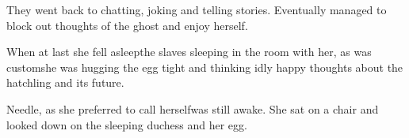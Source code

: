 They went back to chatting, joking and telling stories. 
Eventually \Tiroco{} managed to block out thoughts of the ghost and enjoy herself. 

When at last she fell asleep\dash the slaves sleeping in the room with her, as was custom\dash she was hugging the egg tight and thinking idly happy thoughts about the hatchling and its future. 



% 







\begin{comment}
\subsection{\Piacet{} mocks her mistress}
\end{comment}
\new
\Piacet\dash Needle, as she preferred to call herself\dash was still awake. 
She sat on a chair and looked down on the sleeping duchess and her egg. 

